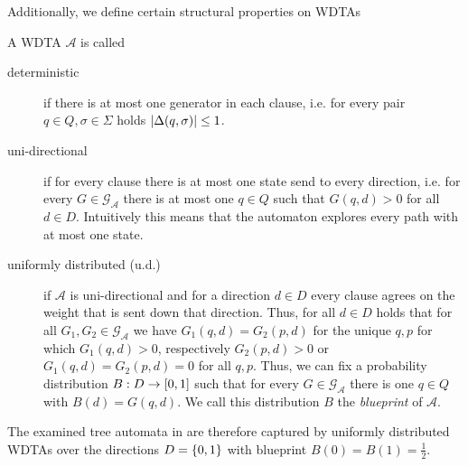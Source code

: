 Additionally, we define certain structural properties on \acp{WDTA}
\begin{definition}
  A \ac{WDTA} $\mathcal{A}$ is called
  \begin{description}
    \item [deterministic] if there is at most one generator in each clause, i.e.
      for every pair $q\in Q, \sigma\in\Sigma$ holds
      $\left\vert{\Delta(q, \sigma)}\right\vert \leq 1$.
    \item [uni-directional] if for every clause there is at most one state send
      to every direction, i.e. for every $G\in\mathcal{G}_{\mathcal{A}}$
      there is at most one $q\in Q$ such that $G(q, d) > 0$ for all
      $d\in D$. Intuitively this means that the automaton explores every path
      with at most one state.
    \item [uniformly distributed (u.d.)] if $\mathcal{A}$ is uni-directional
      and for a direction $d\in D$ every clause agrees on the weight that is
      sent down that direction. Thus, for all $d\in D$ holds that for all
      $G_{1}, G_{2}\in\mathcal{G}_{\mathcal{A}}$ we have
      $G_{1}(q, d) = G_{2}(p, d)$ for the unique $q, p$ for which
      $G_{1}(q, d) > 0$, respectively $G_{2}(p, d) > 0$ or
      $G_{1}(q, d) = G_{2}(p, d) = 0$ for all $q, p$. Thus, we can fix a
      probability distribution $B:D\rightarrow \left[0,1\right]$ such that for
      every $G\in\mathcal{G}_{\mathcal{A}}$ there is one $q\in Q$ with
      $B(d) = G(q, d)$. We call this distribution $B$ the \emph{blueprint} of
      $\mathcal{A}$. 
  \end{description}
\end{definition}
The examined tree automata in \cite{RandAutoInfTrees} are therefore captured by
uniformly distributed \acp{WDTA} over the directions $D = \left\{0,1\right\}$ with
blueprint $B(0) = B(1) = \frac{1}{2}$.


